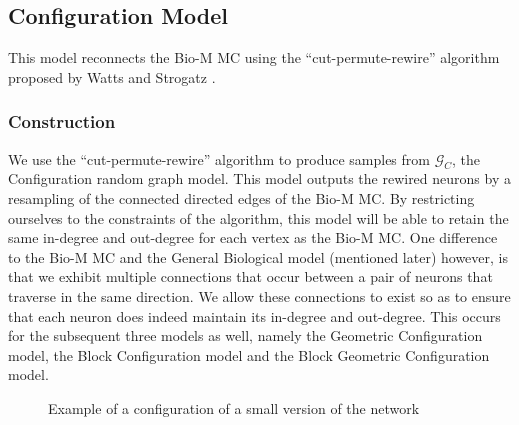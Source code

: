 \newpage


\subsection{Configuration Model}
This model reconnects the Bio-M MC using the ``cut-permute-rewire'' algorithm proposed by Watts and Strogatz \cite{WattsStrogatz1998}.

\subsubsection{Construction}
We use the ``cut-permute-rewire'' algorithm to produce samples from $\mathcal{G}_{C}$, the Configuration random graph model. This model outputs the rewired neurons by a  resampling of the connected directed edges of the Bio-M MC. By restricting ourselves to the constraints of the algorithm, this model will be able to retain the same in-degree and out-degree for each vertex as the Bio-M MC. One difference to the Bio-M MC and the General Biological model (mentioned later) however, is that we exhibit multiple connections that occur between a pair of neurons that traverse in the same direction. We allow these connections to exist so as to ensure that each neuron does indeed maintain its in-degree and out-degree. This occurs for the subsequent three models as well, namely the Geometric Configuration model, the Block Configuration model and the Block Geometric Configuration model.


\begin{figure}[H]%
    \centering
    \captionsetup{justification=centering}
    \qquad
    \caption{Example of a configuration of a small version of the network}%
    \label{fig:example}%
\end{figure}

